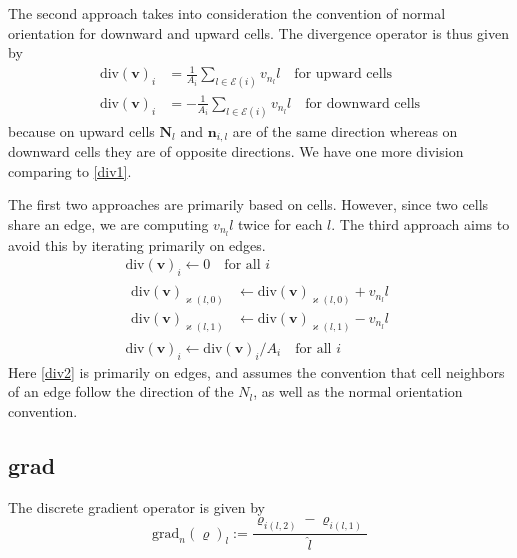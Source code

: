 \documentclass[12pt]{article}
\begin{document}
The second approach takes into consideration the convention of normal orientation for downward and upward cells. The divergence operator is thus given by
\begin{align}
  \text{div}(\bm{v})_i& = \frac{1}{A_i}\sum\limits_{l\in\mathcal{E}(i)}v_{n_l}l \quad \text{for upward cells} \\
  \text{div}(\bm{v})_i& = -\frac{1}{A_i}\sum\limits_{l\in\mathcal{E}(i)}v_{n_l}l \quad \text{for downward cells}
\end{align}
because on upward cells $\bm{N}_l$ and $\bm{n}_{i,l}$ are of the same direction whereas on downward cells they are of opposite directions. We have one more division comparing to \cref{div1}.

The first two approaches are primarily based on cells. However, since two cells share an edge, we are computing $v_{n_l}l$ twice for each $l$. The third approach aims to avoid this by iterating primarily on edges.
\begin{gather}
  \text{div}(\bm{v})_i \leftarrow 0 \quad \text{for all }i \\
  \begin{split}
    \label{div2}
    \text{div}(\bm{v})_{\varkappa(l,0)} &\leftarrow \text{div}(\bm{v})_{\varkappa(l,0)} + v_{n_l}l\\
    \text{div}(\bm{v})_{\varkappa(l,1)} &\leftarrow \text{div}(\bm{v})_{\varkappa(l,1)} - v_{n_l}l
  \end{split}\\
  \text{div}(\bm{v})_i \leftarrow \text{div}(\bm{v})_i / A_i \quad \text{for all }i
\end{gather}
Here \cref{div2} is primarily on edges, and assumes the convention that cell neighbors of an edge follow the direction of the $N_l$, as well as the normal orientation convention.

\subsection{grad}
The discrete gradient operator is given by
\begin{equation}
  \text{grad}_n(\varrho)_l:=\frac{\varrho_{i(l,2)}-\varrho_{i(l,1)}}{\hat{l}}
\end{equation}
\end{document}
